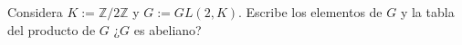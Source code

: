 \question
Considera $K:=\mathbb{Z}/2\mathbb{Z}$ y $G:=GL(2,K)$. 
Escribe los elementos de $G$ y la tabla del producto de $G$ ¿$G$ es abeliano?
